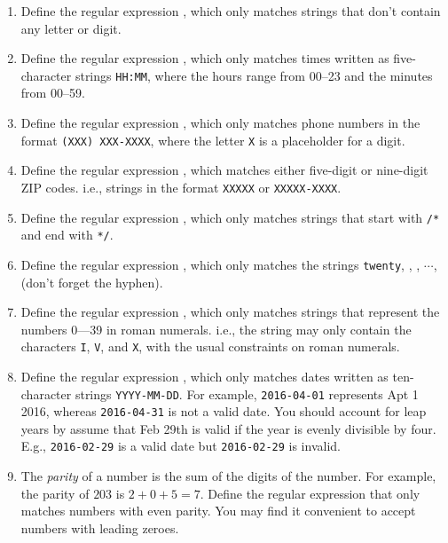 \begin{enumerate}

  \item Define the regular expression , which only matches strings that don't contain any letter or digit.

  \item Define the regular expression , which only matches times written as five-character strings \texttt{HH:MM}, where the hours range from 00--23 and the minutes from 00--59.

  \item Define the regular expression , which only matches phone numbers in the format \texttt{(XXX) XXX-XXXX}, where the letter \texttt{X} is a placeholder for a digit.

  \item Define the regular expression , which matches either five-digit or nine-digit ZIP codes. i.e., strings in the format \texttt{XXXXX} or \texttt{XXXXX-XXXX}.

  \item Define the regular expression , which only matches strings that start with \texttt{/*} and end with \texttt{*/}.

  \item Define the regular expression , which only matches the strings \texttt{twenty}, , , $\cdots$,  (don't forget the hyphen).

  \item Define the regular expression , which only matches strings that represent the numbers 0---39 in roman numerals. i.e., the string may only contain the characters \texttt{I}, \texttt{V}, and \texttt{X}, with the usual constraints on roman numerals.


  \item Define the regular expression , which only matches dates written as ten-character strings \texttt{YYYY-MM-DD}. For example, \texttt{2016-04-01} represents Apt 1 2016, whereas \texttt{2016-04-31} is not a valid date. You should account for leap years by assume that Feb 29th is valid if the year is evenly divisible by four. E.g., \texttt{2016-02-29} is a valid date but \texttt{2016-02-29} is invalid.

  \item The \emph{parity} of a number is the sum of the digits of the number. For example, the parity of $203$ is $2 + 0 + 5 = 7$. Define the regular expression  that only matches numbers with even parity. You may find it convenient to accept numbers with leading zeroes.

\end{enumerate}

